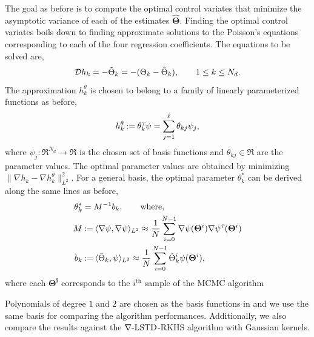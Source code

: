 The goal as before is to compute the optimal control variates that minimize the asymptotic variance of each of the estimates $\hat{\boldsymbol{\Theta}}$.
Finding the optimal control variates boils down to finding approximate  solutions to the Poisson's equations corresponding to each of the four regression coefficients. The equations to be solved are,
\begin{equation}
\generate h_k = -\tilde{\Theta}_k = - (\Theta_k - \hat{\Theta}_k), \qquad   1 \leq k \leq N_d.
\label{e:poisson_logit}
\end{equation}
The approximation $h^\theta_k$ is chosen to belong to a family of linearly parameterized functions as before,
\[
h^\theta_k \mathbin{:=} \theta_k^{\hbox{\tiny\it T}} \psi =  \sum_{j=1}^\ell \theta_{kj} \psi_j,
\]
where $\psi_j : \Re^{N_d} \to \Re$ is the chosen set of basis functions and $\theta_{kj} \in \Re$ are the parameter values.  The optimal parameter values are obtained by minimizing $ \| \nabla h_k - \nabla h^\theta_k \|^2_{L^2}$. For a general basis, the optimal parameter $\theta_k^*$  can be derived along the same lines as before,
\begin{equation}
\begin{aligned}
\theta_k^*  &= M^{-1} b_k, \qquad \text{where,}\\
M & \eqdef \langle \nabla \psi, \nabla \psi \rangle_{L^2} \approx \frac{1}{N} \sum_{i = 0}^{N-1}\nabla \psi(\boldsymbol{\Theta}^i) \nabla \psi^\transpose(\boldsymbol{\Theta}^i)\\
b_k & \eqdef \langle \tilde{\Theta}_k, \psi \rangle_{L^2} \approx \frac{1}{N} \sum_{i=0}^{N-1}\tilde{\Theta}_k^i \psi(\boldsymbol{\Theta}^i), \\
\label{e:theta_k}
\end{aligned}
\end{equation}
where each $\boldsymbol{\Theta^i}$ corresponds to the $i^{\text{th}}$ sample of the MCMC algorithm

Polynomials of degree $1$ and $2$ are chosen as the basis functions in \cite{papmirgir14} and we use the same basis for comparing the algorithm performances. Additionally, we also compare the results against the $\nabla\text{-LSTD}$-RKHS algorithm with Gaussian kernels. 

